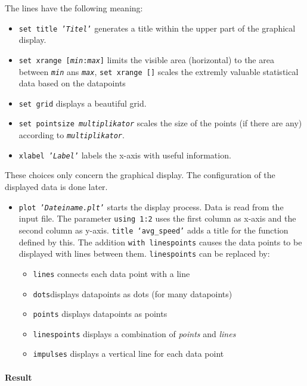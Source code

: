 The lines have the following meaning:
\begin{itemize}
\item \texttt{set title '\textit{Titel}'} generates a title within the upper part of the graphical display.
\item \texttt{set xrange [\textit{min}:\textit{max}]} limits the visible area (horizontal) to the area between \texttt{\textit{min}} ans \texttt{\textit{max}}, \texttt{set xrange []} scales the extremly valuable statistical data based on the datapoints
\item \texttt{set grid} displays a beautiful grid.
\item \texttt{set pointsize \textit{multiplikator}} scales the size of the points (if there are any) according to \texttt{\textit{multiplikator}}.
\item \texttt{xlabel '\textit{Label}'} labels the x-axis with useful information.
\end{itemize}
These choices only concern the graphical display. The configuration of the displayed data is done later.

\begin{itemize}
 \item \texttt{plot '\textit{Dateiname.plt}'} starts the display process. Data is read from the input file. The parameter \texttt{using 1:2} uses the first column as x-axis and the second column as y-axis. \texttt{title `avg\_speed'} adds a title for the function defined by this. The addition \texttt{with linespoints} causes the data points to be displayed with lines between them. \texttt{linespoints} can be replaced by:
\begin{itemize}
\item \texttt{lines} connects each data point with a line
\item \texttt{dots}displays datapoints as dots (for many datapoints)
\item \texttt{points} displays datapoints as points
\item \texttt{linespoints} displays a combination of \textit{points} and \textit{lines}
\item \texttt{impulses} displays a vertical line for each data point
\end{itemize}

\end{itemize}

\paragraph{Result}~\\

